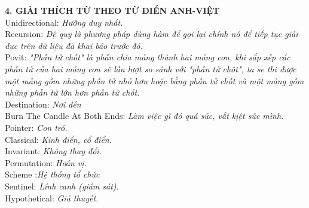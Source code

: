 \documentclass[12pt,a4paper]{article}
\begin{document}
\newpage
 \noindent\textbf{4. GIẢI THÍCH TỪ THEO TỪ ĐIỂN ANH-VIỆT}\\
  \noindent\textbullet \hspace{0.5cm}Unidirectional:\textit{ Hướng duy nhất.}\\
  \textbullet \hspace{0.5cm}Recursion:\textit{ Đệ quy là phương pháp dùng hàm để gọi lại chính nó để tiếp tục giải dực trên dữ liệu đã khai báo trước đó.}\\
   \textbullet \hspace{0.5cm}Povit:\textit{ "Phần tử chốt" là phần chia mảng thành hai mảng con, khi sắp xếp các phần tử của hai mảng con sẽ lần lượt so sánh với "phần tử chôt", ta se thi được một mảng gồm những phần tử nhỏ hơn hoặc bằng phần tử chốt và một mảng gồm những phần tử lớn hơn phần tử chốt. }\\
   \textbullet \hspace{0.5cm}Destination: \textit{Nơi đến}\\
   \textbullet \hspace{0.5cm}Burn The Candle At Both Ends:\textit{ Làm việc gì đó quá sức, vắt kịệt sức mình.}\\
 \textbullet \hspace{0.5cm}Pointer: \textit{Con trỏ.}\\
\textbullet \hspace{0.5cm}Classical:\textit{ Kinh điển, cổ điển}.\\
 \textbullet \hspace{0.5cm}Invariant: \textit{Không thay đổi.}\\
 \textbullet \hspace{0.5cm}Permutation: \textit{Hoán vị.}\\
 \textbullet \hspace{0.5cm}Scheme :\textit{Hệ thống tổ chức}\\
 \textbullet \hspace{0.5cm}Sentinel: \textit{Lính canh (giám sát).}\\
 \textbullet \hspace{0.5cm}Hypothetical: \textit{Giả thuyết.}\\
 
 
 
 
 
 
 
 
 
 
 
 
 
\end{document}
